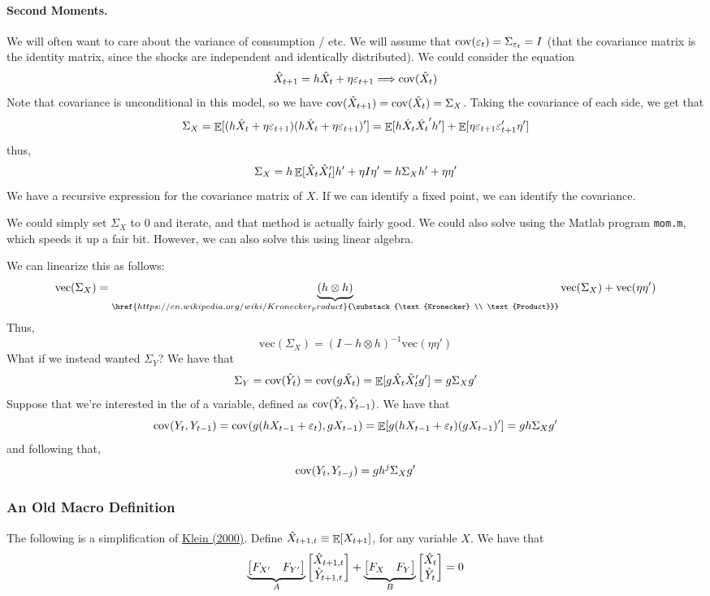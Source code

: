 \documentclass[10pt]{article}
\begin{document}
	\paragraph{Second Moments.} We will often want to care about the variance of consumption / etc. We will assume that $\mathop{\rm cov}(\varepsilon_t) = \Sigma_{\varepsilon_t} = I$ (\ie that the covariance matrix is the identity matrix, since the shocks are independent and identically distributed). We could consider the equation
	\[
	\hat{X}_{t+1} = h\hat{X}_t + \eta \varepsilon_{t+1} \Longrightarrow \mathop{\rm cov}(\hat{X}_t)
	\]
	Note that covariance is unconditional in this model, so we have $\mathop{\rm cov}(\hat{X}_{t+1}) = \mathop{\rm cov}(\hat{X}_t) = \Sigma_X$. Taking the covariance of each side, we get that
	\[
	\Sigma_X = \mathop{\mathbb{E}}[(h \hat{X}_t + \eta \varepsilon_{t+1})(h \hat{X}_t + \eta \varepsilon_{t+1})'] = \mathop{\mathbb{E}}[h\hat{X}_t\hat{X_t}'h'] + \mathop{\mathbb{E}}[\eta \varepsilon_{t+1} \varepsilon_{t+1}' \eta']
	\]
	thus,
	\[
	\Sigma_X = h \mathop{\mathbb{E}}[\hat{X}_t \hat{X}_t'] h' + \eta I \eta' = h \Sigma_X h' + \eta \eta'
	\]
	We have a recursive expression for the covariance matrix of $X$. If we can identify a fixed point, we can identify the covariance. 
	\begin{remark}
		We could simply set $\Sigma_X$ to 0 and iterate, and that method is actually fairly good. We could also solve using the Matlab program \texttt{mom.m}, which speeds it up a fair bit. However, we can also solve this using linear algebra.
	\end{remark}
	We can linearize this as follows:
	\[
	\text{vec}(\Sigma_X) = \underbrace{(h \otimes h)}_{\href{https://en.wikipedia.org/wiki/Kronecker_product}{\substack{\text{Kronecker} \\ \text{Product}}} } \text{vec}(\Sigma_X) + \text{vec}(\eta \eta')
	\]
	Thus,
	\[
	\text{vec}(\Sigma_X) = (I - h\otimes h)^{-1} \text{vec}(\eta \eta')
	\]
	What if we instead wanted $\Sigma_Y$? We have that
	\[
	\Sigma_Y = \mathop{\rm cov}(\hat{Y}_t) = \mathop{\rm cov}(g\hat{X}_t) = \mathop{\mathbb{E}}[g \hat{X}_t \hat{X}_t' g'] = g \Sigma_X g'
	\]
	Suppose that we're interested in the  of a variable, defined as $\mathop{\rm cov}(\hat{Y}_t,\hat{Y}_{t-1})$. We have that
	\[
	\mathop{\rm cov}(Y_t,Y_{t-1}) = \mathop{\rm cov}(g(hX_{t-1} + \varepsilon_t), gX_{t-1}) = \mathop{\mathbb{E}}[g(hX_{t-1} + \varepsilon_t)(gX_{t-1})'] = gh\Sigma_X g'
	\]
	and following that,
	\[
	\mathop{\rm cov}(Y_t,Y_{t-j}) = gh^j\Sigma_X g'
	\]

\subsubsection{An Old Macro Definition} The following is a simplification of \href{https://www.sciencedirect.com/science/article/pii/S0165188999000457}{Klein (2000)}. Define $\hat{X}_{t+1,t} \equiv \mathop{\mathbb{E}}[X_{t+1}]$, for any variable $X$. We have that
\[
\underbrace{\begin{bmatrix}F_{X'} & F_{Y'}\end{bmatrix}}_{A} \begin{bmatrix}\hat{X}_{t+1,t} \\ \hat{Y}_{t+1,t}\end{bmatrix} + \underbrace{\begin{bmatrix}F_X & F_Y\end{bmatrix}}_{B} \begin{bmatrix}\hat{X}_t \\ \hat{Y}_t\end{bmatrix} = 0
\]
\end{document}
